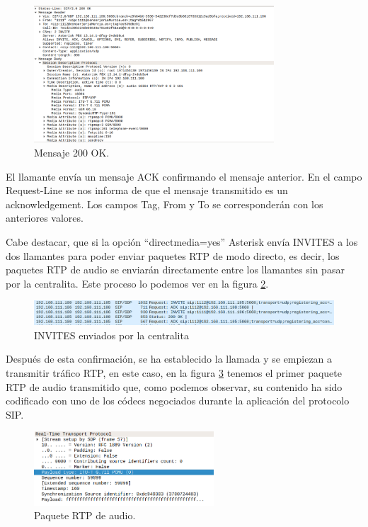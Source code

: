 \documentclass[a4paper]{article}
\begin{document}
\begin{figure}[htb]
    \begin{center}
        \includegraphics[width=0.8\textwidth]{200OK-2.png}
        \caption{Mensaje 200 OK.}
         \label{fig:200ok}
    \end{center}
\end{figure}

El llamante envía un mensaje ACK confirmando el mensaje anterior. En el campo Request-Line se nos informa de que el mensaje transmitido es un acknowledgement. Los campos Tag, From y To se corresponderán con los anteriores valores.

Cabe destacar, que si la opción ``directmedia=yes'' Asterisk envía INVITES a los dos llamantes para poder enviar paquetes RTP de modo directo, es decir, los paquetes RTP de audio se enviarán directamente entre los llamantes sin pasar por la centralita. Este proceso lo podemos ver en la figura \ref{fig:invitesss}.

\begin{figure}[htb]
    \begin{center}
        \includegraphics[width=1\textwidth]{invitesRTP.png}
        \caption{INVITES enviados por la centralita}
         \label{fig:invitesss}
    \end{center}
\end{figure}

\newpage
Después de esta confirmación, se ha establecido la llamada y se empiezan a transmitir tráfico RTP, en este caso, en la figura \ref{fig:RTPaudio} tenemos el primer paquete RTP de audio transmitido que, como podemos observar, su contenido ha sido codificado con uno de los códecs negociados durante la aplicación del protocolo SIP.
\begin{figure}[htb]
    \begin{center}
        \includegraphics[width=0.6\textwidth]{RTP-1.png}
        \caption{Paquete RTP de audio.}
         \label{fig:RTPaudio}
    \end{center}
\end{figure}
\end{document}
